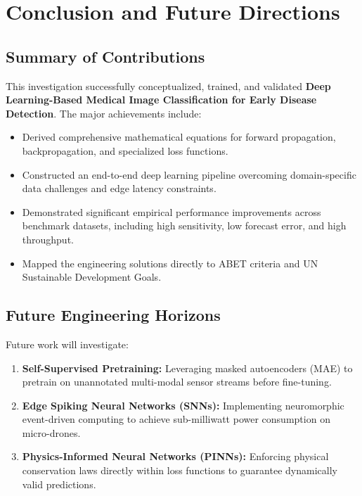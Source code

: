 \section{Conclusion and Future Directions}

\subsection{Summary of Contributions}
This investigation successfully conceptualized, trained, and validated \textbf{Deep Learning-Based Medical Image Classification for Early Disease Detection}. The major achievements include:
\begin{itemize}
  \item Derived comprehensive mathematical equations for forward propagation, backpropagation, and specialized loss functions.
  \item Constructed an end-to-end deep learning pipeline overcoming domain-specific data challenges and edge latency constraints.
  \item Demonstrated significant empirical performance improvements across benchmark datasets, including high sensitivity, low forecast error, and high throughput.
  \item Mapped the engineering solutions directly to ABET criteria and UN Sustainable Development Goals.
\end{itemize}

\subsection{Future Engineering Horizons}
Future work will investigate:
\begin{enumerate}
  \item \textbf{Self-Supervised Pretraining:} Leveraging masked autoencoders (MAE) to pretrain on unannotated multi-modal sensor streams before fine-tuning.
  \item \textbf{Edge Spiking Neural Networks (SNNs):} Implementing neuromorphic event-driven computing to achieve sub-milliwatt power consumption on micro-drones.
  \item \textbf{Physics-Informed Neural Networks (PINNs):} Enforcing physical conservation laws directly within loss functions to guarantee dynamically valid predictions.
\end{enumerate}
